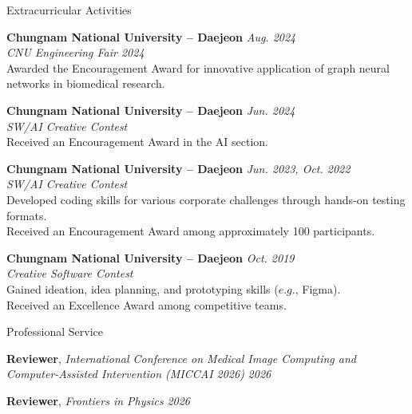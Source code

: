 \documentclass{resume}
\begin{document}
\begin{rSection}{Extracurricular Activities}

\textbf{Chungnam National University -- Daejeon} \hfill \textit{Aug. 2024} \\
\hspace*{0.5em} \textit{CNU Engineering Fair 2024} \\
\hspace*{1em} Awarded the Encouragement Award for innovative application of graph neural networks in biomedical research.

\textbf{Chungnam National University -- Daejeon} \hfill \textit{Jun. 2024} \\
\hspace*{0.5em} \textit{SW/AI Creative Contest} \\
\hspace*{1em} Received an Encouragement Award in the AI section.

\textbf{Chungnam National University -- Daejeon} \hfill \textit{Jun. 2023, Oct. 2022} \\
\hspace*{0.5em} \textit{SW/AI Creative Contest} \\
\hspace*{1em} Developed coding skills for various corporate challenges through hands-on testing formats. \\
\hspace*{1em} Received an Encouragement Award among approximately 100 participants.

\textbf{Chungnam National University -- Daejeon} \hfill \textit{Oct. 2019} \\
\hspace*{0.5em} \textit{Creative Software Contest} \\
\hspace*{1em} Gained ideation, idea planning, and prototyping skills ($e.g.$, Figma). \\
\hspace*{1em} Received an Excellence Award among competitive teams.

\end{rSection}

\begin{rSection}{Professional Service}

\textbf{Reviewer}, \textit{International Conference on Medical Image Computing and Computer-Assisted Intervention (MICCAI 2026)} \hfill \textit{2026}

\textbf{Reviewer}, \textit{Frontiers in Physics} \hfill \textit{2026}

\end{rSection}
\end{document}

